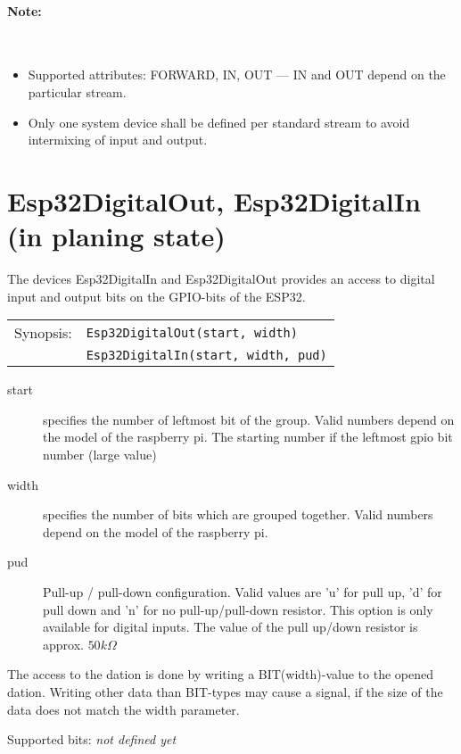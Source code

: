 \paragraph{Note:}\ 
\begin{itemize}
\item Supported attributes: FORWARD, IN, OUT --- IN and OUT depend on the
particular stream.
\item Only one system device shall be defined per standard stream to avoid
intermixing of input and output.
\end{itemize}

\section{Esp32DigitalOut, Esp32DigitalIn (in planing state)}

The devices Esp32DigitalIn and  Esp32DigitalOut provides 
an access to digital input and output bits
on the GPIO-bits of the ESP32.

\begin{tabular}{ll}
Synopsis: & \verb|Esp32DigitalOut(start, width)| \\
          & \verb|Esp32DigitalIn(start, width, pud)| \\
\end{tabular}

\begin{description}
\item[start] specifies the number of leftmost bit of the group. Valid numbers
     depend on the model of the raspberry pi. The starting number if
     the leftmost gpio bit number (large value)
\item [width] specifies the number of bits which are grouped together.
     Valid numbers depend on the model of the raspberry pi.
\item [pud] Pull-up / pull-down configuration.
    Valid values are 'u' for pull up, 'd' for pull down and 
    'n' for no pull-up/pull-down resistor. This option is only
    available for digital inputs. The value of the pull up/down resistor is
    approx. $50 k \Omega$
\end{description}

The access to the dation is done by writing a BIT(width)-value to the
opened dation. 
Writing other data than BIT-types  may cause a signal, if the size of the
data does not match the width parameter. 


Supported bits:
\textit{not defined yet}

